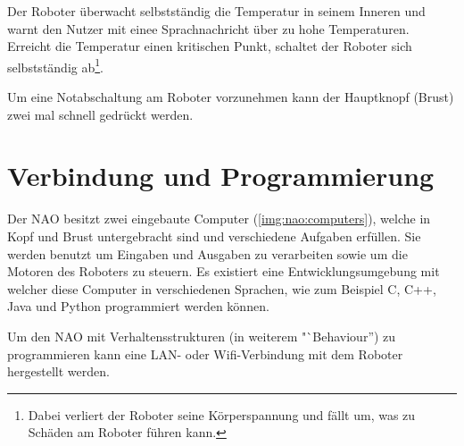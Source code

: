         Der Roboter überwacht selbstständig die Temperatur in seinem Inneren und
        warnt den Nutzer mit einee Sprachnachricht über zu hohe Temperaturen.
        Erreicht die Temperatur einen kritischen Punkt, schaltet der Roboter
        sich selbstständig ab\footnote{Dabei verliert der Roboter seine
            Körperspannung und fällt um, was zu Schäden am Roboter führen
            kann.
        }.

        Um eine Notabschaltung am Roboter vorzunehmen kann der Hauptknopf
        (Brust) zwei mal schnell gedrückt werden.

    \section{Verbindung und Programmierung}

        Der NAO besitzt zwei eingebaute Computer (\autoref{img:nao:computers}),
        welche in Kopf und Brust
        untergebracht sind und verschiedene Aufgaben erfüllen.
        Sie werden benutzt um Eingaben und Ausgaben zu verarbeiten sowie um die
        Motoren des Roboters zu steuern.
        Es existiert eine Entwicklungsumgebung mit welcher diese Computer in
        verschiedenen Sprachen, wie zum Beispiel C, C++, Java und Python
        programmiert werden können.

        Um den NAO mit Verhaltensstrukturen (in weiterem "`Behaviour'') zu
        programmieren kann eine \ac{LAN}- oder \ac{Wifi}-Verbindung mit dem
        Roboter hergestellt werden.


